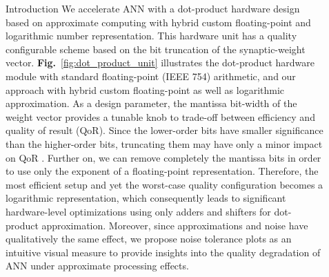 \documentclass[final]{beamer}
\newlength{\sepwid}
\newlength{\onecolwid}
\newlength{\twocolwid}
\newcommand\fig[1]{\textbf{Fig.}~\ref{#1}}
\begin{document}
\begin{frame}[t]
\begin{columns}[t]
\begin{column}{\onecolwid}
\begin{block}{Introduction}
We accelerate ANN with a dot-product hardware design based on approximate computing with hybrid custom floating-point and logarithmic number representation\cite{nevarez2021accelerating}. This hardware unit has a quality configurable scheme based on the bit truncation of the synaptic-weight vector. \fig{fig:dot_product_unit} illustrates the dot-product hardware module with standard floating-point (IEEE 754) arithmetic, and our approach with hybrid custom floating-point as well as logarithmic approximation. As a design parameter, the mantissa bit-width of the weight vector provides a tunable knob to trade-off between efficiency and quality of result (QoR)\cite{han2013approximate}. Since the lower-order bits have smaller significance than the higher-order bits, truncating them may have only a minor impact on QoR \cite{mittal2016survey}. Further on, we can remove completely the mantissa bits in order to use only the exponent of a floating-point representation. Therefore, the most efficient setup and yet the worst-case quality configuration becomes a logarithmic representation, which consequently leads to significant hardware-level optimizations using only adders and shifters for dot-product approximation. Moreover, since approximations and noise have qualitatively the same effect\cite{venkataramani2015approximate}, we propose noise tolerance plots as an intuitive visual measure to provide insights into the quality degradation of ANN under approximate processing effects.


\end{block}

\end{column} %

\begin{column}{\sepwid}\end{column} %

\begin{column}{\twocolwid} %

\begin{columns}[t,totalwidth=\twocolwid] %

\begin{column}{\onecolwid}\vspace{-.6in} %



\end{column}
\end{columns}
\end{column}
\end{columns}
\end{frame}
\end{document}
